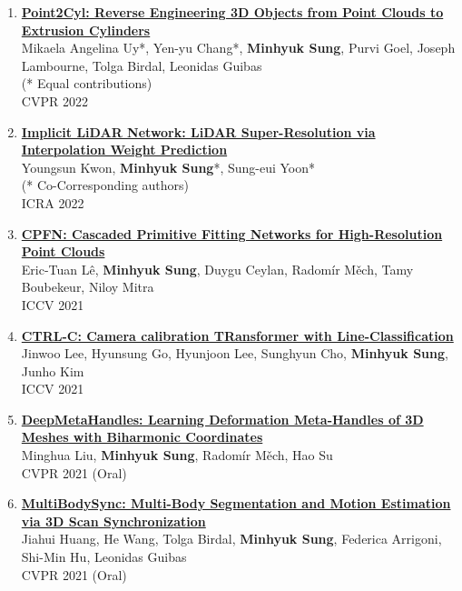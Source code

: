 \documentclass[letterpaper,10pt]{article} %
\newcommand{\blankline}{\quad\pagebreak[2]}
\begin{document}
{\begin{enumerate}
\item \label{cvpr22_1}
\href{https://arxiv.org/abs/2109.02259}{\textbf{Point2Cyl: Reverse Engineering 3D Objects from Point Clouds to Extrusion Cylinders}}\\
Mikaela Angelina Uy*, Yen-yu Chang*, \textbf{Minhyuk Sung}, Purvi Goel, Joseph Lambourne, Tolga Birdal, Leonidas Guibas\\
(* Equal contributions)\\
CVPR 2022\\
\blankline

\item \label{icra22}
\href{https://arxiv.org/abs/2203.06413}{\textbf{Implicit LiDAR Network: LiDAR Super-Resolution via Interpolation Weight Prediction}}\\
Youngsun Kwon, \textbf{Minhyuk Sung}*, Sung-eui Yoon*\\
(* Co-Corresponding authors)\\
ICRA 2022\\
\blankline

\item \label{iccv21_2}
\href{https://arxiv.org/abs/2109.00113}{\textbf{CPFN: Cascaded Primitive Fitting Networks for High-Resolution Point Clouds}}\\
Eric-Tuan Lê, \textbf{Minhyuk Sung}, Duygu Ceylan, Radomír Měch, Tamy Boubekeur, Niloy Mitra\\
ICCV 2021\\
\blankline

\item \label{iccv21_1}
\href{https://arxiv.org/abs/2109.02259}{\textbf{CTRL-C: Camera calibration TRansformer with Line-Classification}}\\
Jinwoo Lee, Hyunsung Go, Hyunjoon Lee, Sunghyun Cho, \textbf{Minhyuk Sung}, Junho Kim\\
ICCV 2021\\
\blankline

\item \label{cvpr21_3}
\href{https://mhsung.github.io/papers/deep-meta-handles.html}{\textbf{DeepMetaHandles: Learning Deformation Meta-Handles of 3D Meshes with Biharmonic Coordinates}}\\
Minghua Liu, \textbf{Minhyuk Sung}, Radomír Měch, Hao Su\\
CVPR 2021 (Oral)\\
\blankline

\item \label{cvpr21_2}
\href{https://cg.cs.tsinghua.edu.cn/people/~huangjh/publication/multibodysync/}{\textbf{MultiBodySync: Multi-Body Segmentation and Motion Estimation via 3D Scan Synchronization}}\\
Jiahui Huang, He Wang, Tolga Birdal, \textbf{Minhyuk Sung}, Federica Arrigoni, Shi-Min Hu, Leonidas Guibas\\
CVPR 2021 (Oral)\\
\blankline


\end{enumerate}}
\end{document}

